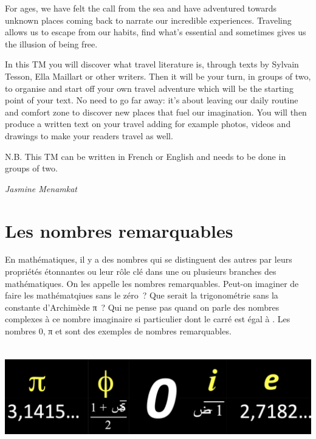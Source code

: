 \documentclass[
  10pt,
  french,
  a5paper,
  openany]{book}
\newenvironment{signature}{\begin{flushright}}{\end{flushright}}
\begin{document}
For ages, we have felt the call from the sea and have adventured towards unknown places coming back to narrate our incredible experiences. Traveling allows us to escape from our habits, find what's essential and sometimes gives us the illusion of being free.

In this TM you will discover what travel literature is, through texts by Sylvain Tesson, Ella Maillart or other writers. Then it will be your turn, in groups of two, to organise and start off your own travel adventure which will be the starting point of your text. No need to go far away: it's about leaving our daily routine and comfort zone to discover new places that fuel our imagination. You will then produce a written text on your travel adding for example photos, videos and drawings to make your readers travel as well.

N.B. This TM can be written in French or English and needs to be done in groups of two.

\begin{signature}
\emph{Jasmine Menamkat}

\end{signature}

\hypertarget{les-nombres-remarquables}{%
\chapter{Les nombres remarquables}\label{les-nombres-remarquables}}

En mathématiques, il y a des nombres qui se distinguent des autres par leurs propriétés étonnantes ou leur rôle clé dans une ou plusieurs branches des mathématiques. On les appelle les nombres remarquables.
Peut-on imaginer de faire les mathématqiues sans le zéro~? Que serait la trigonométrie sans la constante d'Archimède π~? Qui ne pense pas quand on parle des nombres complexes à ce nombre imaginaire si particulier dont le carré est égal à . Les nombres 0, π et sont des exemples de nombres remarquables.

\begin{center}
\includegraphics[width=\textwidth,height=12em]{images/les-nombres-remarquables-1.jpg}

\end{center}
\end{document}
